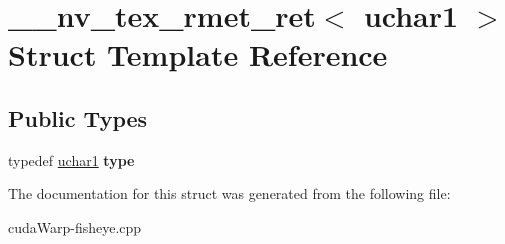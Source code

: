 \hypertarget{struct____nv__tex__rmet__ret_3_01uchar1_01_4}{}\section{\+\_\+\+\_\+nv\+\_\+tex\+\_\+rmet\+\_\+ret$<$ uchar1 $>$ Struct Template Reference}
\label{struct____nv__tex__rmet__ret_3_01uchar1_01_4}
\subsection*{Public Types}
\begin{DoxyCompactItemize}
\item 
typedef \hyperlink{structuchar1}{uchar1} {\bfseries type}\hypertarget{struct____nv__tex__rmet__ret_3_01uchar1_01_4_ac23bddee9b4fa4cf370b95373874aee8}{}\label{struct____nv__tex__rmet__ret_3_01uchar1_01_4_ac23bddee9b4fa4cf370b95373874aee8}

\end{DoxyCompactItemize}


The documentation for this struct was generated from the following file\+:\begin{DoxyCompactItemize}
\item 
cuda\+Warp-\/fisheye.\+cpp\end{DoxyCompactItemize}
